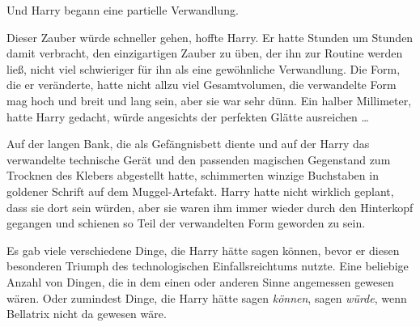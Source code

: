 Und Harry begann eine partielle Verwandlung.

Dieser Zauber würde schneller gehen, hoffte Harry. Er hatte Stunden um Stunden damit verbracht, den einzigartigen Zauber zu üben, der ihn zur Routine werden ließ, nicht viel schwieriger für ihn als eine gewöhnliche Verwandlung. Die Form, die er veränderte, hatte nicht allzu viel Gesamtvolumen, die verwandelte Form mag hoch und breit und lang sein, aber sie war sehr dünn. Ein halber Millimeter, hatte Harry gedacht, würde angesichts der perfekten Glätte ausreichen …

Auf der langen Bank, die als Gefängnisbett diente und auf der Harry das verwandelte technische Gerät und den passenden magischen Gegenstand zum Trocknen des Klebers abgestellt hatte, schimmerten winzige Buchstaben in goldener Schrift auf dem Muggel-Artefakt. Harry hatte nicht wirklich geplant, dass sie dort sein würden, aber sie waren ihm immer wieder durch den Hinterkopf gegangen und schienen so Teil der verwandelten Form geworden zu sein.

Es gab viele verschiedene Dinge, die Harry hätte sagen können, bevor er diesen besonderen Triumph des technologischen Einfallsreichtums nutzte. Eine beliebige Anzahl von Dingen, die in dem einen oder anderen Sinne angemessen gewesen wären. Oder zumindest Dinge, die Harry hätte sagen \emph{können}, sagen \emph{würde}, wenn Bellatrix nicht da gewesen wäre.

